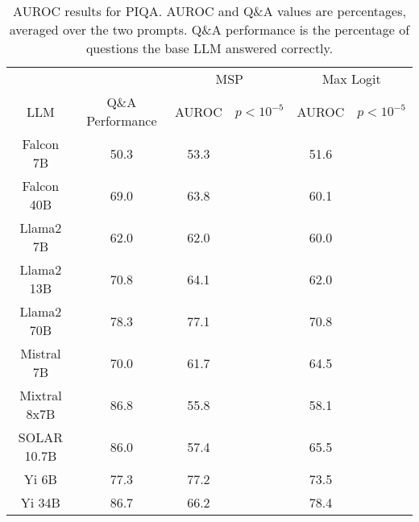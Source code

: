 \begin{table*}
\centering
\begin{tabular}{c|c|c|c|c|c}
& & \multicolumn{2}{c|}{MSP} & \multicolumn{2}{c}{Max Logit} \\ 
LLM & Q\&A Performance & AUROC & $p < 10^{-5}$ & AUROC & $p < 10^{-5}$\\ \hline
Falcon 7B & 50.3 & 53.3 &  & 51.6 & \\
Falcon 40B & 69.0 & 63.8 &  & 60.1 & \\
Llama2 7B & 62.0 & 62.0 &  & 60.0 & \\
Llama2 13B & 70.8 & 64.1 &  & 62.0 & \\
Llama2 70B & 78.3 & 77.1 &  & 70.8 & \\
Mistral 7B & 70.0 & 61.7 &  & 64.5 & \\
Mixtral 8x7B & 86.8 & 55.8 &  & 58.1 & \\
SOLAR 10.7B & 86.0 & 57.4 &  & 65.5 & \\
Yi 6B & 77.3 & 77.2 &  & 73.5 & \\
Yi 34B & 86.7 & 66.2 &  & 78.4 & \\
\hline
\end{tabular}
\caption{AUROC results for PIQA. AUROC and Q\&A values are percentages, averaged over the two prompts. Q\&A performance is the percentage of questions the base LLM answered correctly.}
\label{tab:piqa_auroc}
\end{table*}
